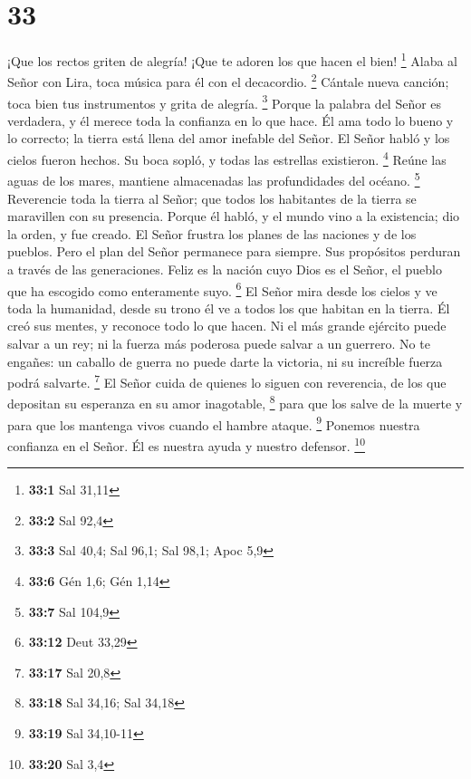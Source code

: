 \hypertarget{section-32}{%
\section{33}\label{section-32}}

 ¡Que los rectos griten de alegría! ¡Que te adoren los que
hacen el bien! \footnote{\textbf{33:1} Sal 31,11}  Alaba al
Señor con Lira, toca música para él con el decacordio. \footnote{\textbf{33:2}
  Sal 92,4}  Cántale nueva canción; toca bien tus
instrumentos y grita de alegría. \footnote{\textbf{33:3} Sal 40,4; Sal
  96,1; Sal 98,1; Apoc 5,9}  Porque la palabra del Señor es
verdadera, y él merece toda la confianza en lo que hace.  Él
ama todo lo bueno y lo correcto; la tierra está llena del amor inefable
del Señor.  El Señor habló y los cielos fueron hechos. Su
boca sopló, y todas las estrellas existieron. \footnote{\textbf{33:6}
  Gén 1,6; Gén 1,14}  Reúne las aguas de los mares, mantiene
almacenadas las profundidades del océano. \footnote{\textbf{33:7} Sal
  104,9}  Reverencie toda la tierra al Señor; que todos los
habitantes de la tierra se maravillen con su presencia. 
Porque él habló, y el mundo vino a la existencia; dio la orden, y fue
creado.  El Señor frustra los planes de las naciones y de
los pueblos.  Pero el plan del Señor permanece para
siempre. Sus propósitos perduran a través de las generaciones.
 Feliz es la nación cuyo Dios es el Señor, el pueblo que ha
escogido como enteramente suyo. \footnote{\textbf{33:12} Deut 33,29}
 El Señor mira desde los cielos y ve toda la humanidad,
 desde su trono él ve a todos los que habitan en la tierra.
 Él creó sus mentes, y reconoce todo lo que hacen.
 Ni el más grande ejército puede salvar a un rey; ni la
fuerza más poderosa puede salvar a un guerrero.  No te
engañes: un caballo de guerra no puede darte la victoria, ni su
increíble fuerza podrá salvarte. \footnote{\textbf{33:17} Sal 20,8}
 El Señor cuida de quienes lo siguen con reverencia, de los
que depositan su esperanza en su amor inagotable, \footnote{\textbf{33:18}
  Sal 34,16; Sal 34,18}  para que los salve de la muerte y
para que los mantenga vivos cuando el hambre ataque. \footnote{\textbf{33:19}
  Sal 34,10-11}  Ponemos nuestra confianza en el Señor. Él
es nuestra ayuda y nuestro defensor. \footnote{\textbf{33:20} Sal 3,4}

